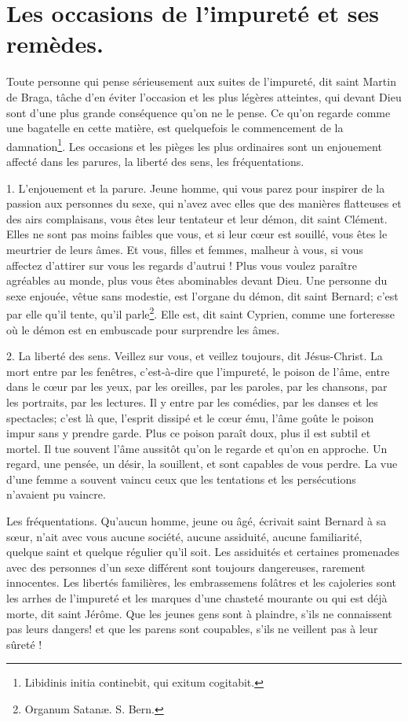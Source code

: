 \documentclass[instructions.tex]{subfiles}
\begin{document}
 
\chapter{Les occasions de l’impureté et ses remèdes.}
 
\primo Toute personne qui pense sérieusement aux suites de l’impureté, dit saint Martin de Braga, tâche d’en éviter l’occasion et les plus légères atteintes, qui devant Dieu sont d’une plus grande conséquence qu’on ne le pense. Ce qu’on regarde comme une bagatelle en cette matière, est quelquefois le commencement de la damnation\footnote{Libidinis initia continebit, qui exitum cogitabit.}. Les occasions et les pièges les plus ordinaires sont un enjouement affecté dans les parures, la liberté des sens, les fréquentations.
 
1. L’enjouement et la parure. Jeune homme, qui vous parez pour inspirer de la passion aux personnes du sexe, qui n’avez avec elles que des manières flatteuses et des airs complaisans, vous êtes leur tentateur et leur démon, dit saint Clément. Elles ne sont pas moins faibles que vous, et si leur cœur est souillé, vous êtes le meurtrier de leurs âmes. Et vous, filles et femmes, malheur à vous, si vous affectez d’attirer sur vous les regards d’autrui ! Plus vous voulez paraître agréables au monde, plus vous êtes abominables devant Dieu. Une personne du sexe enjouée, vêtue sans modestie, est l’organe du démon, dit saint Bernard; c’est par elle qu’il tente, qu’il parle\footnote{Organum Satanæ. S. Bern.}. Elle est, dit saint Cyprien, comme une forteresse où le démon est en embuscade pour surprendre les âmes.
 
2. La liberté des sens. Veillez sur vous, et veillez toujours, dit Jésus-Christ. La mort entre par les fenêtres, c’est-à-dire que l’impureté, le poison de l’âme, entre dans le cœur par les yeux, par les oreilles, par les paroles, par les chansons, par les portraits, par les lectures. Il y entre par les comédies, par les danses et les spectacles; c’est là que, l’esprit dissipé et le cœur ému, l’âme goûte le poison impur sans y prendre garde. Plus ce poison paraît doux, plus il est subtil et mortel. Il tue souvent l’âme aussitôt qu’on le regarde et qu’on en approche. Un regard, une pensée, un désir, la souillent, et sont capables de vous perdre. La vue d’une femme a souvent vaincu ceux que les tentations et les persécutions n’avaient pu vaincre.
 
Les fréquentations. Qu’aucun homme, jeune ou âgé, écrivait saint Bernard à sa sœur, n’ait avec vous aucune société, aucune assiduité, aucune familiarité, quelque saint et quelque régulier qu’il soit. Les assiduités et certaines promenades avec des personnes d’un sexe différent sont toujours dangereuses, rarement innocentes. Les libertés familières, les embrassemens folâtres et les cajoleries sont les arrhes de l’impureté et les marques d’une chasteté mourante ou qui est déjà morte, dit saint Jérôme. Que les jeunes gens sont à plaindre, s’ils ne connaissent pas leurs dangers! et que les parens sont coupables, s’ils ne veillent pas à leur sûreté !
 
\end{document}

